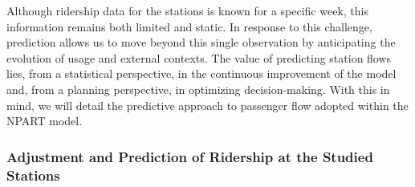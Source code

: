 \begin{refsegment}

Although ridership data for the stations is known for a specific week, this information remains both limited and static. In response to this challenge, prediction allows us to move beyond this single observation by anticipating the evolution of usage and external contexts. The value of predicting station flows lies, from a statistical perspective, in the continuous improvement of the model and, from a planning perspective, in optimizing decision-making. With this in mind, we will detail the predictive approach to passenger flow adopted within the \acrshort{NPART} model.

\subsubsection*{Adjustment and Prediction of Ridership at the Studied Stations
    \label{chap6:methodologie-indicateurs-frequentation-prediction}
    }


\end{refsegment}
